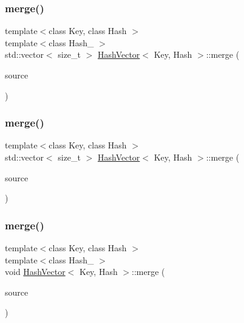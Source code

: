 \mbox{\label{class_hash_vector_ab01fbdc2f06fa662ba32745325687b34}} 
\subsubsection{\texorpdfstring{merge()}{merge()}\hspace{0.1cm}{\footnotesize\ttfamily [1/3]}}
{\footnotesize\ttfamily template$<$class Key, class Hash $>$ \\
template$<$class Hash\+\_ $>$ \\
std\+::vector$<$ size\+\_\+t $>$ \mbox{\hyperlink{class_hash_vector}{Hash\+Vector}}$<$ Key, Hash $>$\+::merge (\begin{DoxyParamCaption}\item[{const \mbox{\hyperlink{class_hash_vector}{Hash\+Vector}}$<$ Key, Hash\+\_\+2 $>$ \&}]{source }\end{DoxyParamCaption})}

\mbox{\label{class_hash_vector_a25a8f930a3a8bb4b63eb079148443ac4}} 
\subsubsection{\texorpdfstring{merge()}{merge()}\hspace{0.1cm}{\footnotesize\ttfamily [2/3]}}
{\footnotesize\ttfamily template$<$class Key, class Hash $>$ \\
std\+::vector$<$ size\+\_\+t $>$ \mbox{\hyperlink{class_hash_vector}{Hash\+Vector}}$<$ Key, Hash $>$\+::merge (\begin{DoxyParamCaption}\item[{const std\+::vector$<$ Key $>$ \&}]{source }\end{DoxyParamCaption})}

\mbox{\label{class_hash_vector_a49f4a94f737008dfc3298e55c419b83f}} 
\subsubsection{\texorpdfstring{merge()}{merge()}\hspace{0.1cm}{\footnotesize\ttfamily [3/3]}}
{\footnotesize\ttfamily template$<$class Key, class Hash $>$ \\
template$<$class Hash\+\_ $>$ \\
void \mbox{\hyperlink{class_hash_vector}{Hash\+Vector}}$<$ Key, Hash $>$\+::merge (\begin{DoxyParamCaption}\item[{const std\+::unordered\+\_\+set$<$ Key, Hash\+\_\+2 $>$ \&}]{source }\end{DoxyParamCaption})}

